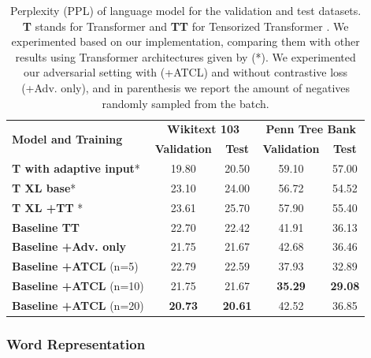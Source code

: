 \documentclass[letterpaper]{article} %
\begin{document}
\begin{table}[t]
\begin{tabular}{l|cccc}
\hline
\multirow{2}{*}{\textbf{Model and Training}} & \multicolumn{2}{c}{\textbf{Wikitext 103}} & \multicolumn{2}{c}{\textbf{Penn Tree Bank}} \\ \cline{2-5} 
 & \textbf{Validation}         & \textbf{Test}        & \textbf{Validation}          & \textbf{Test}         \\ \hline
\textbf{T with adaptive input}*   &  19.80  &  20.50  &  59.10  & 57.00 \\ 
\textbf{T XL base}* & 23.10 & 24.00 & 56.72  & 54.52 \\ 
\textbf{T XL +TT} * & 23.61 &  25.70 & 57.90  & 55.40  \\ \hline
\textbf{Baseline TT} & 22.70 & 22.42 & 41.91 & 36.13 \\ 
\textbf{Baseline +Adv. only} & 21.75 & 21.67 & 42.68 & 36.46 \\ \hline
\textbf{Baseline +ATCL} (n=5) & 22.79 & 22.59 & 37.93 & 32.89\\ 
\textbf{Baseline +ATCL} (n=10) & 21.75 & 21.67 & \textbf{35.29} & \textbf{29.08} \\  
\textbf{Baseline +ATCL} (n=20) & \textbf{20.73} & \textbf{20.61} & 42.52 & 36.85 \\ 
\hline
\end{tabular}
	\centering
	\caption{Perplexity (PPL) of language model for the validation and test datasets. \textbf{T} stands for Transformer \cite{vaswani2017attention} and \textbf{TT} for Tensorized Transformer \cite{ma2019tensorized}. We experimented based on our implementation, comparing them with other results using Transformer architectures given by \cite{ma2019tensorized} (*). We experimented our adversarial setting with (+ATCL) and without contrastive loss (+Adv. only), and in parenthesis we report the amount of negatives randomly sampled from the batch.}
	\label{tab:lmresults}
\end{table}


\subsubsection{Word Representation}
\end{document}
